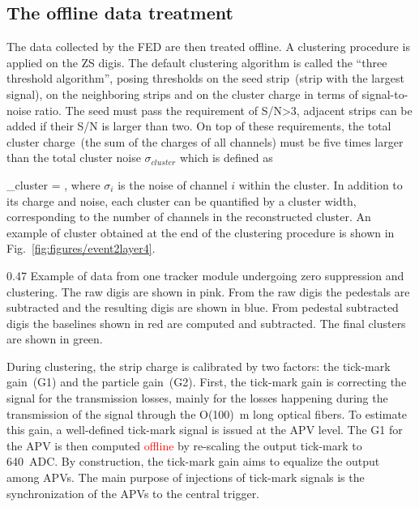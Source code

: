 \subsection{The offline data treatment~\label{sec:localreco}}


The data collected by the FED are then treated offline. A clustering procedure is applied on the ZS digis. The default clustering algorithm is called the ``three threshold algorithm'', posing thresholds on the seed strip~(strip with the largest signal), on the neighboring strips and on the cluster charge in terms of signal-to-noise ratio. The seed must pass the requirement of S/N>3, adjacent strips can be added if their S/N is larger than two. On top of these requirements, the total cluster charge~(the sum of the charges of all channels) must be five times larger than the total cluster noise $\sigma_{cluster}$ which is defined as


{
    \sigma_{cluster} = ,
}
where $\sigma_{i}$ is the noise of channel $i$ within the cluster. In addition to its charge and noise, each cluster can be quantified by a cluster width, corresponding to the number of channels in the reconstructed cluster. An example of cluster obtained at the end of the clustering procedure is shown in Fig.~\ref{fig:figures/event2layer4}.

                 {0.47}       %
                 {Example of data from one tracker module undergoing zero suppression and clustering. The raw digis are shown in pink. From the raw digis the pedestals are subtracted and the resulting digis are shown in blue. From pedestal subtracted digis the baselines shown in red are computed and subtracted. The final clusters are shown in green.} %


During clustering, the strip charge is calibrated by two factors: the tick-mark gain~(G1) and the particle gain~(G2). First, the tick-mark gain is correcting the signal for the transmission losses, mainly for the losses happening during the transmission of the signal through the O(100)~m long optical fibers. To estimate this gain, a well-defined tick-mark signal is issued at the APV level. The G1 for the APV is then computed \textcolor{red}{offline} by re-scaling the output tick-mark to 640~ADC. By construction, the tick-mark gain aims to equalize the output among APVs. The main purpose of injections of tick-mark signals is the synchronization of the APVs to the central trigger.

